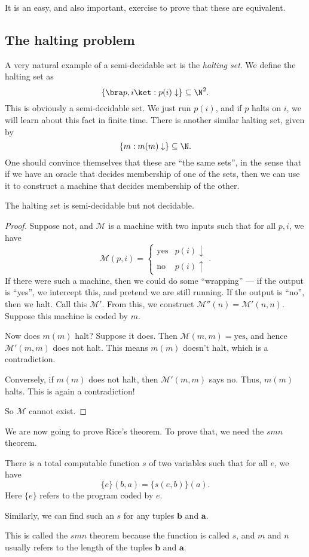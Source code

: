 \documentclass[a4paper]{article}
\begin{document}
It is an easy, and also important, exercise to prove that these are equivalent.
\subsection{The halting problem}
A very natural example of a semi-decidable set is the \emph{halting set}. We define the halting set as
\[
  \{\bra p, i\ket : p(i) \downarrow \} \subseteq \N^2.
\]
This is obviously a semi-decidable set. We just run $p(i)$, and if $p$ halts on $i$, we will learn about this fact in finite time. There is another similar halting set, given by
\[
  \{m: m(m) \downarrow\} \subseteq \N.
\]
One should convince themselves that these are ``the same sets'', in the sense that if we have an oracle that decides membership of one of the sets, then we can use it to construct a machine that decides membership of the other.

\begin{thm}[Turing]
  The halting set is semi-decidable but not decidable.
\end{thm}

\begin{proof}
  Suppose not, and $\mathcal{M}$ is a machine with two inputs such that for all $p, i$, we have
  \[
    \mathcal{M}(p, i) =
    \begin{cases}
      \mathrm{yes} & p(i) \downarrow\\
      \mathrm{no} & p(i) \uparrow
    \end{cases}.
  \]
  If there were such a machine, then we could do some ``wrapping'' --- if the output is ``yes'', we intercept this, and pretend we are still running. If the output is ``no'', then we halt. Call this $\mathcal{M}'$. From this, we construct $\mathcal{M}''(n) = \mathcal{M}'(n, n)$. Suppose this machine is coded by $m$.

  Now does $m(m)$ halt? Suppose it does. Then $\mathcal{M}(m, m) = \mathrm{yes}$, and hence $\mathcal{M}'(m, m)$ does not halt. This means $m(m)$ doesn't halt, which is a contradiction.

  Conversely, if $m(m)$ does not halt, then $\mathcal{M}'(m, m)$ says $\mathrm{no}$. Thus, $m(m)$ halts. This is again a contradiction!

  So $\mathcal{M}$ cannot exist.
\end{proof}

We are now going to prove Rice's theorem. To prove that, we need the $smn$ theorem.

\begin{thm}
  There is a total computable function $s$ of two variables such that for all $e$, we have
  \[
    \{e\}(b, a) = \{s(e, b)\}(a).
  \]
  Here $\{e\}$ refers to the program coded by $e$.

  Similarly, we can find such an $s$ for any tuples $\mathbf{b}$ and $\mathbf{a}$.
\end{thm}
This is called the $smn$ theorem because the function is called $s$, and $m$ and $n$ usually refers to the length of the tuples $\mathbf{b}$ and $\mathbf{a}$.
\end{document}
